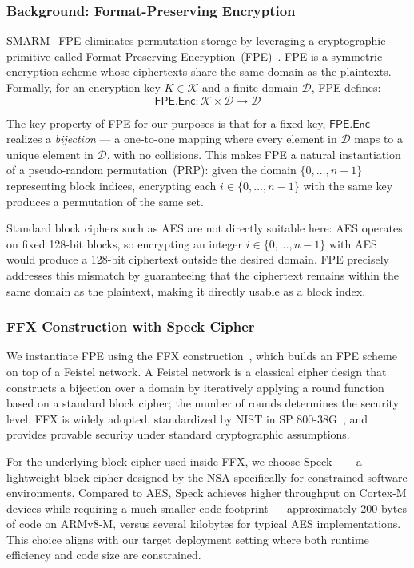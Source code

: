 \documentclass[a4paper,10pt]{article}
\begin{document}
{\subsubsection{Background: Format-Preserving Encryption}

SMARM+FPE eliminates permutation storage by 
leveraging a cryptographic primitive called Format-Preserving 
Encryption~(FPE)~\cite{bellare2009fpe,dworkin2016sp800}. FPE is a 
symmetric encryption scheme whose ciphertexts share the same domain 
as the plaintexts. Formally, for an encryption key $K \in 
\mathcal{K}$ and a finite domain $\mathcal{D}$, FPE defines:
\[
\textsf{FPE.Enc}: \mathcal{K} \times \mathcal{D} \rightarrow \mathcal{D}
\]

The key property of FPE for our purposes is that for a fixed key, 
$\textsf{FPE.Enc}$ realizes a \emph{bijection} — a one-to-one 
mapping where every element in $\mathcal{D}$ maps to a unique 
element in $\mathcal{D}$, with no collisions. This makes FPE a 
natural instantiation of a pseudo-random permutation~(PRP): given 
the domain $\{0, \ldots, n-1\}$ representing block indices, 
encrypting each $i \in \{0, \ldots, n-1\}$ with the same key 
produces a permutation of the same set.

Standard block ciphers such as AES are not directly suitable here: 
AES operates on fixed 128-bit blocks, so encrypting an integer 
$i \in \{0, \ldots, n-1\}$ with AES would produce a 128-bit 
ciphertext outside the desired domain. FPE precisely addresses 
this mismatch by guaranteeing that the ciphertext remains within 
the same domain as the plaintext, making it directly usable as 
a block index.

\subsubsection{FFX Construction with Speck Cipher}

We instantiate FPE using the FFX 
construction~\cite{bellare2010ffx}, which builds an FPE scheme on 
top of a Feistel network. A Feistel network is a classical 
cipher design that constructs a bijection over a domain by 
iteratively applying a round function based on a standard block 
cipher; the number of rounds determines the security level. FFX 
is widely adopted, standardized by NIST in SP 800-38G~\cite{dworkin2016sp800}, 
and provides provable security under standard cryptographic 
assumptions.

For the underlying block cipher used inside FFX, we choose 
Speck~\cite{beaulieu2015simon} — a lightweight block cipher 
designed by the NSA specifically for constrained software 
environments. Compared to AES, Speck achieves higher throughput 
on Cortex-M devices while requiring a much smaller code 
footprint — approximately 200 bytes of code on ARMv8-M, versus 
several kilobytes for typical AES implementations. This choice 
aligns with our target deployment setting where both runtime 
efficiency and code size are constrained.

}
\end{document}

